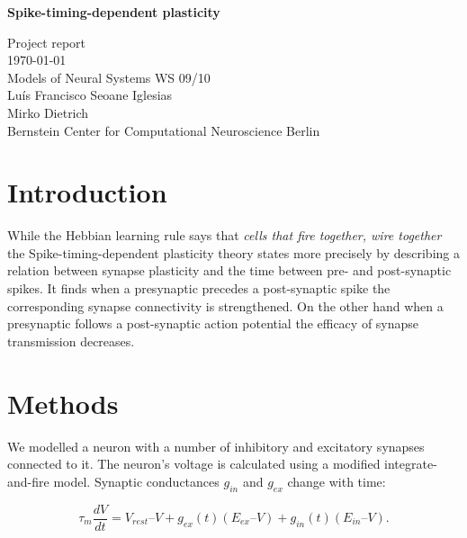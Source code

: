 \documentclass[a4paper,12pt,oneside]{article}
\begin{document}
\begin{titlepage}
\begin{center}
\begin{spacing}{2}
{\huge\bf Spike-timing-dependent plasticity} \\
\end{spacing}
\Large
Project report \\
\vfill
\normalsize
\today \\
\vspace{5em}
Models of Neural Systems WS 09/10 \\
\vspace{1em}
Luís Francisco Seoane Iglesias \\
Mirko Dietrich \\
\vspace{1em}
Bernstein Center for Computational Neuroscience Berlin
\end{center}
\end{titlepage}

\tableofcontents

\newpage

\section{Introduction}

While the Hebbian learning rule says that \textit{cells that fire
  together, wire together} the Spike-timing-dependent plasticity
theory states more precisely by describing a relation between synapse
plasticity and the time between pre- and post-synaptic spikes. It finds
when a presynaptic precedes a post-synaptic spike the corresponding
synapse connectivity is strengthened. On the other hand when a
presynaptic follows a post-synaptic action potential the efficacy of
synapse transmission decreases.\cite{Song:2000}

\section{Methods}

We modelled a neuron with a number of inhibitory and excitatory
synapses connected to it. The neuron's voltage is calculated using a
modified integrate-and-fire model. Synaptic conductances $g_{in}$ and
$g_{ex}$ change with time:

\[
\tau_m \frac{dV}{dt} = V_{rest} – V + g_{ex}(t)(E_{ex} – V) + g_{in}(t)(E_{in} – V). 
\]
\end{document}
